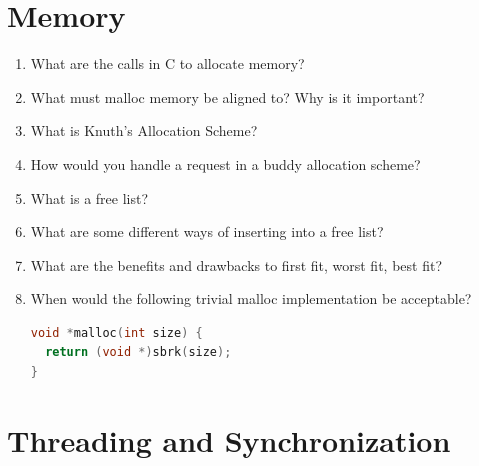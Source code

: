 \section{Memory}

\begin{enumerate}
\item What are the calls in C to allocate memory?
\item What must malloc memory be aligned to? Why is it important?
\item What is Knuth's Allocation Scheme?
\item How would you handle a request in a buddy allocation scheme?
\item What is a free list?
\item What are some different ways of inserting into a free list?
\item What are the benefits and drawbacks to first fit, worst fit, best fit?
\item When would the following trivial malloc implementation be acceptable?
\begin{lstlisting}[language=C]
void *malloc(int size) {
  return (void *)sbrk(size);
}
\end{lstlisting}
\end{enumerate}

\section{Threading and Synchronization}

